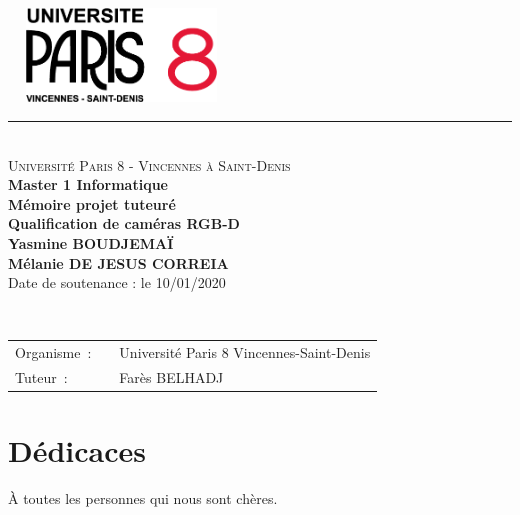\documentclass[a4paper, 12pt]{book}
\begin{document}
\begin{titlepage}
  \begin{center}
      \includegraphics[height=2.5cm, width=6cm]{images/paris8Logo.png}
    \small 
    \rule{\textwidth}{.5pt}~\\
    \large 
    \textsc{Université Paris 8 - Vincennes à Saint-Denis}\vspace{0.5cm}\\
    \textbf{Master 1 Informatique}\vspace{3.0cm}\\
    \Large
    \textbf{Mémoire projet tuteuré}\\
    \textbf{Qualification de caméras RGB-D}\vspace{1.5cm}\\
    
    \large
    \textbf{Yasmine BOUDJEMAÏ}\\
\textbf{Mélanie DE JESUS CORREIA}\vspace{1.5cm}\\
    Date de soutenance : le 10/01/2020\\
  \end{center}\vspace{3.5cm}~\\
  \begin{tabular}{ll}
    \hspace{-0.45cm}Organisme~:~&~Université Paris 8 Vincennes-Saint-Denis\\
    \hspace{-0.45cm}Tuteur~:~&~Farès  \textsc{BELHADJ}\\
  \end{tabular}
\end{titlepage}
\frontmatter



\chapter*{Dédicaces}
\par À toutes les personnes qui nous sont chères.
\end{document}
